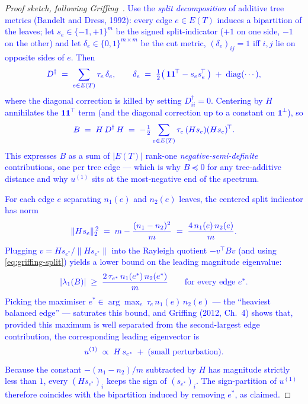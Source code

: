 \documentclass[11pt]{article}
\newcommand{\new}[1]{\textcolor{blue}{#1}}
\newcommand{\newmath}[1]{{\color{blue} #1}}
\theoremstyle{remark}
\newcommand{\1}{\mathbf{1}}
\newcommand{\Ddist}{D^{\dagger}}      %
\newcommand{\Bop}{B}
\newcommand{\Hop}{H}                  %
\begin{document}
\begin{proof}[Proof sketch, following Griffing~\cite{Griffing2012}]
\new{Use the \emph{split decomposition} of additive tree metrics
(Bandelt and Dress, 1992): every edge $e \in E(T)$ induces a bipartition
of the leaves; let $s_{e} \in \{-1,+1\}^{m}$ be the signed
split-indicator ($+1$ on one side, $-1$ on the other) and let
$\delta_{e} \in \{0,1\}^{m\times m}$ be the cut metric, $(\delta_{e})_{ij}
= 1$ iff $i,j$ lie on opposite sides of $e$. Then}
\begin{equation*}
\newmath{
  \Ddist \;=\; \sum_{e \in E(T)} \tau_{e}\,\delta_{e},
  \qquad
  \delta_{e} \;=\; \tfrac{1}{2}\bigl(\,\1\1^{\!\top} - s_{e} s_{e}^{\!\top}\,\bigr)
                  \;+\; \mathrm{diag}(\cdots),
}
\end{equation*}
\new{where the diagonal correction is killed by setting $\Ddist_{ii} = 0$.
Centering by $\Hop$ annihilates the $\1\1^{\!\top}$ term (and the
diagonal correction up to a constant on $\1^{\perp}$), so}
\begin{equation}
\newmath{
  \Bop \;=\; \Hop\,\Ddist\,\Hop
       \;=\; -\tfrac{1}{2}\sum_{e \in E(T)} \tau_{e}\,(\Hop s_{e})(\Hop s_{e})^{\!\top}.
}
\label{eq:griffing-split}
\end{equation}
\new{This expresses $\Bop$ as a sum of $|E(T)|$ rank-one
\emph{negative-semi-definite} contributions, one per tree edge --- which
is why $\Bop \preceq 0$ for any tree-additive distance and why
$u^{(1)}$ sits at the most-negative end of the spectrum.}

\new{For each edge $e$ separating $n_{1}(e)$ and $n_{2}(e)$ leaves, the
centered split indicator has norm}
\begin{equation*}
\newmath{
  \|\Hop s_{e}\|_{2}^{\,2}
  \;=\; m - \frac{(n_{1} - n_{2})^{2}}{m}
  \;=\; \frac{4\, n_{1}(e)\, n_{2}(e)}{m}.
}
\end{equation*}
\new{Plugging $v = \Hop s_{e^{*}} / \|\Hop s_{e^{*}}\|$ into the
Rayleigh quotient $-v^{\!\top}\Bop v$ (and using
\eqref{eq:griffing-split}) yields a lower bound on the leading
magnitude eigenvalue:}
\begin{equation*}
\newmath{
  |\lambda_{1}(\Bop)|
  \;\geq\;
  \frac{2\,\tau_{e^{*}}\,n_{1}(e^{*})\,n_{2}(e^{*})}{m}
  \qquad\text{for every edge } e^{*}.
}
\end{equation*}
\new{Picking the maximiser $e^{*} \in \arg\max_{e}\,\tau_{e}\,n_{1}(e)\,n_{2}(e)$
--- the ``heaviest balanced edge'' --- saturates this bound, and Griffing
(2012, Ch.\ 4) shows that, provided this maximum is well separated from
the second-largest edge contribution, the corresponding leading
eigenvector is}
\begin{equation*}
\newmath{
  u^{(1)} \;\propto\; \Hop\,s_{e^{*}}\;+\;\mathrm{(small\ perturbation)}.
}
\end{equation*}
\new{Because the constant $-(n_{1} - n_{2})/m$ subtracted by $\Hop$ has
magnitude strictly less than $1$, every $(\Hop s_{e^{*}})_{i}$ keeps the
sign of $(s_{e^{*}})_{i}$. The sign-partition of $u^{(1)}$ therefore
coincides with the bipartition induced by removing $e^{*}$, as
claimed.}\qedhere
\end{proof}
\end{document}
